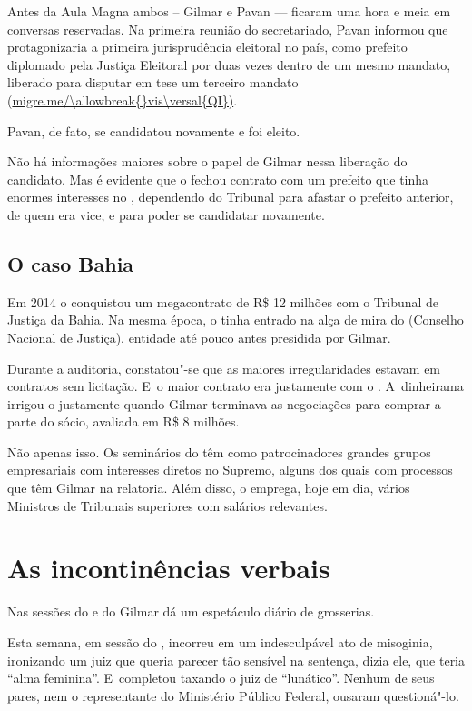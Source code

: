 Antes da Aula Magna ambos -- Gilmar e Pavan --- ficaram uma hora e meia
em conversas reservadas. Na primeira reunião do secretariado, Pavan
informou que protagonizaria a primeira jurisprudência eleitoral no país,
como prefeito diplomado pela Justiça Eleitoral por duas vezes dentro de
um mesmo mandato, liberado para disputar em tese um terceiro mandato
(\url{migre.me/\allowbreak{}vis\versal{QI})}.

Pavan, de fato, se candidatou novamente e foi eleito.

Não há informações maiores sobre o papel de Gilmar nessa liberação do
candidato. Mas é evidente que o  fechou contrato com um prefeito que
tinha enormes interesses no , dependendo do Tribunal para afastar o
prefeito anterior, de quem era vice, e para poder se candidatar
novamente.

\subsection{O caso  Bahia}

Em 2014 o  conquistou um megacontrato de R\$ 12 milhões com o
Tribunal de Justiça da Bahia. Na mesma época, o  tinha entrado na
alça de mira do  (Conselho Nacional de Justiça), entidade até pouco
antes presidida por Gilmar.

Durante a auditoria, constatou"-se que as maiores irregularidades estavam
em contratos sem licitação. E~o maior contrato era justamente com o .
A~dinheirama irrigou o  justamente quando Gilmar terminava as
negociações para comprar a parte do sócio, avaliada em R\$ 8 milhões.

Não apenas isso. Os seminários do  têm como patrocinadores grandes
grupos empresariais com interesses diretos no Supremo, alguns dos quais
com processos que têm Gilmar na relatoria. Além disso, o  emprega,
hoje em dia, vários Ministros de Tribunais superiores com salários
relevantes.

\section{As incontinências verbais}

Nas sessões do  e do  Gilmar dá um espetáculo diário de
grosserias.

Esta semana, em sessão do , incorreu em um indesculpável ato de
misoginia, ironizando um juiz que queria parecer tão sensível na
sentença, dizia ele, que teria ``alma feminina''. E~completou taxando o
juiz de ``lunático''. Nenhum de seus pares, nem o representante do
Ministério Público Federal, ousaram questioná"-lo.

